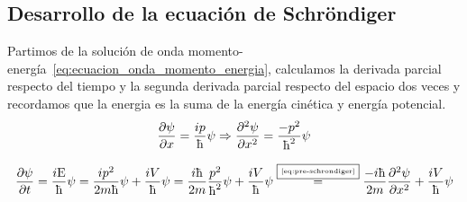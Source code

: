 \subsection{Desarrollo de la ecuación de Schröndiger}\label{subsec:desarrollo-de-la-ecuación-de-schrondiger}

Partimos de la solución de onda momento-energía~\eqref{eq:ecuacion_onda_momento_energia}, calculamos la derivada parcial respecto del tiempo y la segunda derivada parcial respecto del espacio dos veces y recordamos que la energia es la suma de la energía cinética y energía potencial.
\begin{equation}
    \label{eq:pre-schrondiger}
    \frac{\partial\psi}{\partial x}=\frac{ip}{\planckbarsymbol}\psi\so\frac{\partial^2\psi}{\partial x^2}=\frac{-p^2}{\planckbarsymbol^2}\psi
\end{equation}

\begin{equation}
    \label{eq:desarrollo-ecuacion-schrodinger}
    \frac{\partial\psi}{\partial t}=\frac{i\energia}{\planckbarsymbol}\psi=\frac{ip^2}{2m\planckbarsymbol}\psi+\frac{iV}{\planckbarsymbol}\psi=\frac{i\planckbarsymbol}{2m}\frac{p^2}{\planckbarsymbol^2}\psi+\frac{iV}{\planckbarsymbol}\psi\by{\ref{eq:pre-schrondiger}}\frac{-i\planckbarsymbol}{2m}\frac{\partial^2\psi}{\partial x^2}+\frac{iV}{\planckbarsymbol}\psi
\end{equation}
